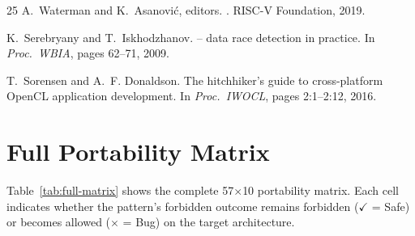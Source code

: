 \documentclass[10pt]{article}
\newcommand{\cmark}{$\checkmark$}
\newcommand{\xmark}{$\times$}
\begin{document}
\begin{thebibliography}{25}
A.~Waterman and K.~Asanovi{\'c}, editors.
.
\newblock RISC-V Foundation, 2019.

K.~Serebryany and T.~Iskhodzhanov.
 -- data race detection in practice.
\newblock In {\em Proc.\ WBIA}, pages 62--71, 2009.

T.~Sorensen and A.~F. Donaldson.
\newblock The hitchhiker's guide to cross-platform {OpenCL} application development.
\newblock In {\em Proc.\ IWOCL}, pages 2:1--2:12, 2016.

\end{thebibliography}

\clearpage
\appendix

\section{Full Portability Matrix}
\label{app:full-matrix}

Table~\ref{tab:full-matrix} shows the complete 57$\times$10 portability
matrix. Each cell indicates whether the pattern's forbidden outcome
remains forbidden (\cmark{} = Safe) or becomes allowed (\xmark{} = Bug)
on the target architecture.
\end{document}

